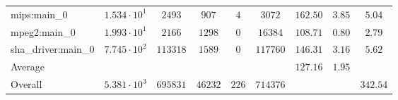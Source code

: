 \begin{tabular}{|l|c|c|c|c|c|c|c|c|}
mips:main\_0            & $ 1.534 \cdot 10^{1}  $ & $ 2493   $ & $ 907   $ & $ 4   $ & $ 3072   $ & $ 162.50      $ & $ 3.85    $ & $ 5.04    $ \\
mpeg2:main\_0           & $ 1.993 \cdot 10^{1}  $ & $ 2166   $ & $ 1298  $ & $ 0   $ & $ 16384  $ & $ 108.71      $ & $ 0.80    $ & $ 2.79    $ \\
sha\_driver:main\_0     & $ 7.745 \cdot 10^{2}  $ & $ 113318 $ & $ 1589  $ & $ 0   $ & $ 117760 $ & $ 146.31      $ & $ 3.16    $ & $ 5.62    $ \\
\hline
Average                 & $                     $ & $        $ & $       $ & $     $ & $        $ & $ 127.16      $ & $ 1.95    $ & $         $ \\
\hline
Overall                 & $ 5.381 \cdot 10^{3}  $ & $ 695831 $ & $ 46232 $ & $ 226 $ & $ 714376 $ & $             $ & $         $ & $ 342.54  $ \\
\hline
\end{tabular}
